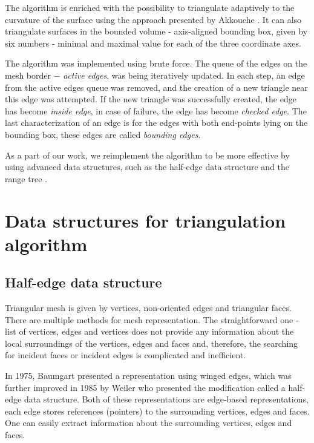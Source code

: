 The algorithm is enriched with the possibility to triangulate adaptively
to the curvature of the surface using the approach presented by Akkouche 
\cite{akkouche2001adaptive}. It can also triangulate surfaces in the
bounded volume - axis-aligned bounding box, given by six numbers - minimal
and maximal value for each of the three coordinate axes.

The algorithm was implemented using brute force. The queue of the edges
on the mesh border $-$ \textit{active edges}, was being iteratively updated. 
In each step, an edge from the active edges queue was removed, and the creation of a new triangle near this edge was attempted.
If the new triangle was successfully created, the edge has become 
\textit{inside edge}, in case of failure, the edge has become 
\textit{checked edge}. The last characterization of an edge is for
the edges with both end-points lying on the bounding box, these edges
are called \textit{bounding edges}.

As a part of our work, we reimplement the algorithm to be more effective by
using advanced data structures, such as the half-edge data structure 
\cite{kettner1999using} and the range tree \cite{lueker1978data}.

\section{Data structures for triangulation algorithm}
\label{sub2.5}

\subsection{Half-edge data structure}
Triangular mesh is given by vertices, non-oriented edges and triangular faces.
There are multiple methods for mesh representation. The straightforward one -
list of vertices, edges and vertices does not provide any information about
the local surroundings of the vertices, edges and faces and, therefore, the searching
for incident faces or incident edges is complicated and inefficient.

In 1975, Baumgart \cite{baumgart1975polyhedron} presented a representation
using winged edges, which was further improved in 1985 by Weiler \cite{weiler1985edge}
who presented the modification called a half-edge data structure.
Both of these representations are edge-based representations, each edge stores
references (pointers) to the surrounding vertices, edges and faces. One can easily extract information about the
surrounding vertices, edges and faces.


